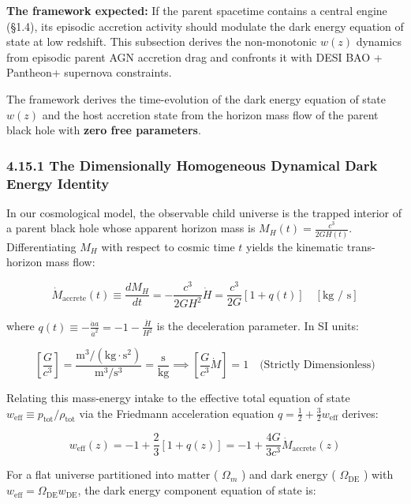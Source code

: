 \documentclass[11pt,a4paper]{article}
\theoremstyle{definition}\newtheorem{definition}{Definition}
\theoremstyle{remark}\newtheorem{remark}{Remark}
\begin{document}
\textbf{The framework expected:} If the parent spacetime contains a central engine (§1.4), its episodic accretion activity should modulate the dark energy equation of state at low redshift. This subsection derives the non-monotonic $w(z)$ dynamics from episodic parent AGN accretion drag and confronts it with DESI BAO + Pantheon+ supernova constraints.

The framework derives the time-evolution of the dark energy equation of state $w(z)$ and the host accretion state from the horizon mass flow of the parent black hole with \textbf{zero free parameters}.
\subsubsection{4.15.1 The Dimensionally Homogeneous Dynamical Dark Energy Identity}

In our cosmological model, the observable child universe is the trapped interior of a parent black hole whose apparent horizon mass is $M_H(t) = \frac{c^3}{2 G H(t)}$. Differentiating $M_H$ with respect to cosmic time $t$ yields the kinematic trans-horizon mass flow:


\begin{equation}
\dot{M}_{\text{accrete}}(t) \equiv \frac{d M_H}{dt} = -\frac{c^3}{2 G H^2} \dot{H} = \frac{c^3}{2G} [1 + q(t)] \quad [\text{kg / s}]
\end{equation}


where $q(t) \equiv -\frac{\ddot{a} a}{\dot{a}^2} = -1 - \frac{\dot{H}}{H^2}$ is the deceleration parameter. In SI units:


\begin{equation}
\left[ \frac{G}{c^3} \right] = \frac{\text{m}^3 / (\text{kg} \cdot \text{s}^2)}{\text{m}^3 / \text{s}^3} = \frac{\text{s}}{\text{kg}} \implies \left[ \frac{G}{c^3} \dot{M} \right] = 1 \quad \text{(Strictly Dimensionless)}
\end{equation}


Relating this mass-energy intake to the effective total equation of state $w_{\text{eff}} \equiv p_{\text{tot}} / \rho_{\text{tot}}$ via the Friedmann acceleration equation $q = \frac{1}{2} + \frac{3}{2} w_{\text{eff}}$ derives:


\begin{equation}
\boxed{w_{\text{eff}}(z) = -1 + \frac{2}{3}[1 + q(z)] = -1 + \frac{4G}{3c^3} \dot{M}_{\text{accrete}}(z)}
\end{equation}


For a flat universe partitioned into matter ( $\Omega_m$ ) and dark energy ( $\Omega_{\text{DE}}$ ) with $w_{\text{eff}} = \Omega_{\text{DE}} w_{\text{DE}}$, the dark energy component equation of state is:
\end{document}
